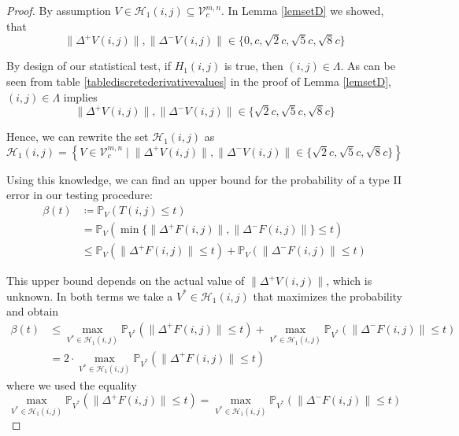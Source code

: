 \documentclass[a4paper,12pt]{article}
\newcommand{\norm}[1]{\lVert#1\rVert}
\theoremstyle{plain}
\theoremstyle{definition}
\begin{document}
\begin{proof}
	By assumption $V \in \mathcal{H}_1(i, j) \subseteq \mathcal{V}_c^{m, n}$. In Lemma \ref{lemsetD} we showed, that
	\begin{equation*}
		\norm{\Delta^+ V(i, j)}, \norm{\Delta^- V(i, j)} \in \{ 0, c, \sqrt{2} c, \sqrt{5} c, \sqrt{8} c \}
	\end{equation*}
	
	By design of our statistical test, if $H_1(i, j)$ is true, then $(i, j) \in \varLambda$. As can be seen from table \ref{tablediscretederivativevalues} in the proof of Lemma \ref{lemsetD}, $(i, j) \in \varLambda$ implies
	\begin{equation*}
		\norm{\Delta^+ V(i, j)}, \norm{\Delta^- V(i, j)} \in \{ \sqrt{2} c, \sqrt{5} c, \sqrt{8} c \}
	\end{equation*}
	
	Hence, we can rewrite the set $\mathcal{H}_1(i, j)$ as
	\begin{equation*}
		\mathcal{H}_1(i, j) = \left\{ V \in \mathcal{V}_c^{m, n} \mid \norm{\Delta^+ V(i, j)}, \norm{\Delta^- V(i, j)} \in \{ \sqrt{2} c, \sqrt{5} c, \sqrt{8} c \} \right\}
	\end{equation*}
	
	Using this knowledge, we can find an upper bound for the probability of a type II error in our testing procedure:
	\begin{align*}
		\beta(t) &\coloneqq \mathbb{P}_V( T(i, j) \leq t ) \\
		&= \mathbb{P}_V( \min \{ \norm{\Delta^+ F(i, j)}, \norm{\Delta^- F(i, j)} \} \leq t ) \\
		&\leq \mathbb{P}_V( \norm{\Delta^+ F(i, j)} \leq t) + \mathbb{P}_V(\norm{\Delta^- F(i, j)} \leq t )
	\end{align*}
	
	This upper bound depends on the actual value of $\norm{\Delta^+ V(i, j)}$, which is unknown. In both terms we take a $V^* \in \mathcal{H}_1(i, j)$ that maximizes the probability and obtain
	\begin{align*}
		\beta(t) &\leq \max_{V^* \in \mathcal{H}_1(i, j)} \mathbb{P}_{V^*}( \norm{\Delta^+ F(i, j)} \leq t ) + \max_{V^* \in \mathcal{H}_1(i, j)} \mathbb{P}_{V^*}( \norm{\Delta^- F(i, j)} \leq t ) \\
		&= 2 \cdot \max_{V^* \in \mathcal{H}_1(i, j)} \mathbb{P}_{V^*}( \norm{\Delta^+ F(i, j)} \leq t )
	\end{align*}
	where we used the equality
	\begin{equation*}
		\max_{V^* \in \mathcal{H}_1(i, j)} \mathbb{P}_{V^*}( \norm{\Delta^+ F(i, j)} \leq t ) = \max_{V^* \in \mathcal{H}_1(i, j)} \mathbb{P}_{V^*}( \norm{\Delta^- F(i, j)} \leq t )
	\end{equation*}
	

\end{proof}
\end{document}
